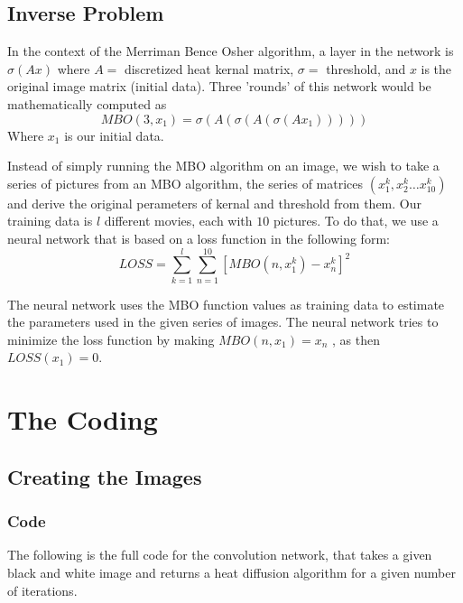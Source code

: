 \documentclass[12pt]{article}
\theoremstyle{plain}
\theoremstyle{definition}
\theoremstyle{remark}
\begin{document}
\subsection{Inverse Problem}
In the context of the Merriman Bence Osher algorithm, a layer in the network is $\sigma(Ax)$ where $A=$ discretized  heat kernal matrix, $\sigma=$ threshold, and $x$ is the original image matrix (initial data).  Three 'rounds' of this network would be mathematically computed as $$MBO(3, x_1)=\sigma(A(\sigma(A(\sigma(Ax_1)))))$$
Where $x_1$ is our initial data. 


Instead of simply running the MBO algorithm on an image, we wish to take a series of pictures from an MBO algorithm, the series of matrices $(x_1^k, x_2^k \ldots x_{10}^k)$ and derive the original perameters of kernal and threshold from them. Our training data is $l$ different movies, each with $10$ pictures. To do that, we use a neural network that is based on a loss function in the following form: 
$$LOSS = \sum_{k=1}^l\sum_{n=1}^{10} [MBO(n, x_1^k) - x_{n}^k]^2$$

The neural network uses the MBO function values as training data to estimate the parameters used in the given series of images. The neural network tries to minimize the loss function by making $MBO(n, x_1) = x_n$ , as then $LOSS(x_1)=0$.

\section{The Coding}
\subsection{Creating the Images}
\subsubsection{Code}
The following is the full code for the convolution network, that takes a given black and white image and returns a heat diffusion algorithm for a given number of iterations. 
\end{document}
